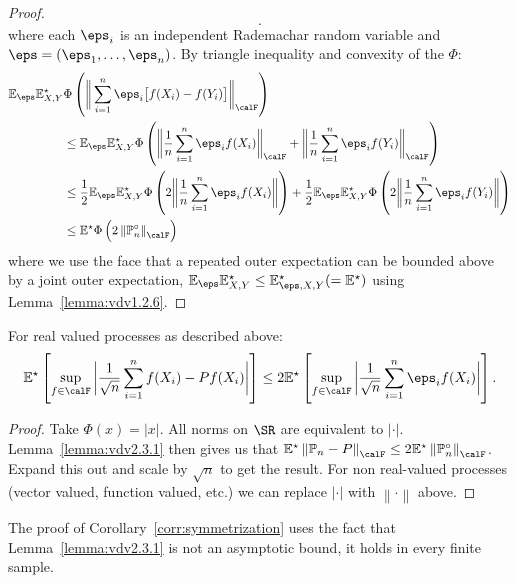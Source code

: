 \begin{proof}
\[	.\]
	where each \(\eps_i\) is an independent Rademachar random variable and  \(\eps = (\eps_1,\dots,\eps_n)\). By triangle inequality and convexity of the \(\Phi\):
	\begin{align*}
		\E_\eps\E^\star_{X,Y}&\Phi\left(\bigg\|\sum_{i=1}^n \eps_i\big[f(X_i)-f(Y_i)\big]\bigg\|_\calF\right)\\ 
		&\leq \E_\eps\E^\star_{X,Y}\Phi\left(\bigg\|\frac{1}{n}\sum_{i=1}^n \eps_if(X_i)\bigg\|_\calF + \bigg\|\frac{1}{n}\sum_{i=1}^n \eps_if(Y_i) \bigg\|_\calF\right)\\
		&\leq  \frac{1}{2}\E_\eps\E^\star_{X,Y}\Phi\left(2\bigg\|\frac{1}{n} \sum_{i=1}^n \eps_if(X_i)\bigg\|\right) + \frac{1}{2}\E_\eps\E^\star_{X,Y}\Phi\left(2\bigg\|\frac{1}{n} \sum_{i=1}^n \eps_if(Y_i)\bigg\|\right) \\
		&\leq \E^\star\Phi\left(2\left\|\P_n^\circ\right\|_\calF\right)
	\end{align*}
	where we use the face that a repeated outer expectation can be bounded above by a joint outer expectation, \(\E_\eps\E^\star_{X,Y} \leq \E^\star_{\eps,X,Y} (=\E^\star)\) using Lemma~\ref{lemma:vdv1.2.6}.
\end{proof}

\begin{corollary}
    \label{corr:symmetrization}
	For real valued processes as described above:
	\[
		\E^\star\left[\sup_{f\in\calF}\bigg|\frac{1}{\sqrt{n}}\sum_{i=1}^n f(X_i)- P f(X_i)\bigg| \right] \leq 2\E^\star \left[\sup_{f\in\calF}\bigg|\frac{1}{\sqrt{n}}\sum_{i=1}^n \eps_if(X_i)\bigg|\right]
	.\] 
\end{corollary}
\begin{proof}
	Take \(\Phi(x) = |x|\). All norms on \(\SR\) are equivalent to \(|\cdot|\). Lemma~\ref{lemma:vdv2.3.1} then gives us that \(\E^\star\left\|\P_n - P\right\|_\calF \leq 2\E^\star\left\|\P_n^\circ\right\|_\calF\). Expand this out and scale by \(\sqrt{n}\) to get the result. For non real-valued processes (vector valued, function valued, etc.) we can replace \(\left|\cdot\right|\) with \(\left\|\cdot\right\|\) above.
\end{proof}
\begin{remark*}
	The proof of Corollary~\ref{corr:symmetrization} uses the fact that Lemma~\ref{lemma:vdv2.3.1} is not an asymptotic bound, it holds in every finite sample. 
\end{remark*}

